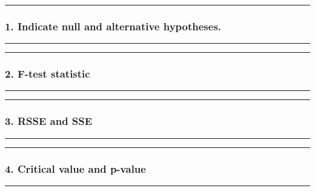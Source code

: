 \documentclass[
  letterpaper,
  DIV=11,
  numbers=noendperiod]{scrartcl}
\begin{document}
\begin{center}\rule{0.5\linewidth}{0.5pt}\end{center}

\subsubsection{\texorpdfstring{1. Indicate \textbf{null and alternative
hypotheses}.}{1. Indicate null and alternative hypotheses.}}\label{indicate-null-and-alternative-hypotheses.}

\begin{center}\rule{0.5\linewidth}{0.5pt}\end{center}

\begin{center}\rule{0.5\linewidth}{0.5pt}\end{center}

\subsubsection{\texorpdfstring{2. \textbf{F-test
statistic}}{2. F-test statistic}}\label{f-test-statistic}

\begin{center}\rule{0.5\linewidth}{0.5pt}\end{center}

\begin{center}\rule{0.5\linewidth}{0.5pt}\end{center}

\subsubsection{3. RSSE and SSE}\label{rsse-and-sse}

\begin{center}\rule{0.5\linewidth}{0.5pt}\end{center}

\begin{center}\rule{0.5\linewidth}{0.5pt}\end{center}

\subsubsection{4. Critical value and
p-value}\label{critical-value-and-p-value}

\begin{center}\rule{0.5\linewidth}{0.5pt}\end{center}
\end{document}
